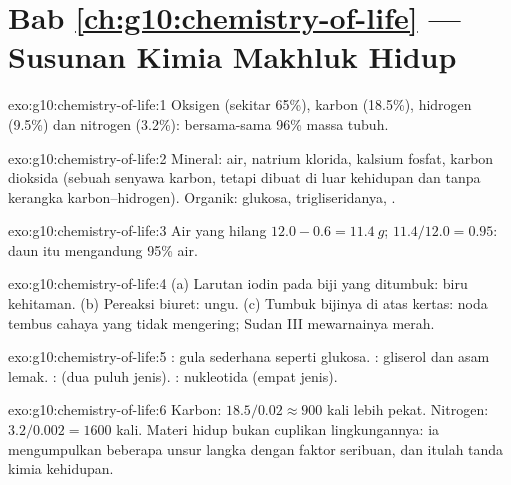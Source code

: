 \section*{Bab \ref{ch:g10:chemistry-of-life} --- Susunan Kimia Makhluk Hidup}

\begin{solution}{exo:g10:chemistry-of-life:1}
Oksigen (sekitar 65\%), karbon (18.5\%), hidrogen (9.5\%) dan nitrogen
(3.2\%): bersama-sama 96\% massa tubuh.
\end{solution}

\begin{solution}{exo:g10:chemistry-of-life:2}
Mineral: air, natrium klorida, kalsium fosfat, karbon dioksida (sebuah
senyawa karbon, tetapi dibuat di luar kehidupan dan tanpa kerangka
karbon--hidrogen). Organik: glukosa, trigliseridanya, .
\end{solution}

\begin{solution}{exo:g10:chemistry-of-life:3}
Air yang hilang $12.0 - 0.6 = \qty{11.4}{g}$; $11.4/12.0 = 0.95$: daun
itu mengandung 95\% air.
\end{solution}

\begin{solution}{exo:g10:chemistry-of-life:4}
(a) Larutan iodin pada biji yang ditumbuk: biru kehitaman. (b) Pereaksi
biuret: ungu. (c) Tumbuk bijinya di atas kertas: noda tembus cahaya
yang tidak mengering; Sudan III mewarnainya merah.
\end{solution}

\begin{solution}{exo:g10:chemistry-of-life:5}
: gula sederhana seperti glukosa. : gliserol dan
asam lemak. :  (dua puluh jenis). :
nukleotida (empat jenis).
\end{solution}

\begin{solution}{exo:g10:chemistry-of-life:6}
Karbon: $18.5/0.02 \approx 900$ kali lebih pekat. Nitrogen:
$3.2/0.002 = 1600$ kali. Materi hidup bukan cuplikan
lingkungannya: ia mengumpulkan beberapa unsur langka dengan faktor
seribuan, dan itulah tanda kimia kehidupan.
\end{solution}

